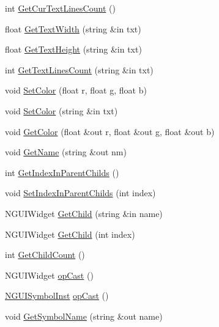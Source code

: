 \begin{DoxyCompactItemize}
\item 
int \hyperlink{class_n_g_u_i_symbol_inst_a42306f44487648c6b89a6aaea58bfd78}{Get\+Cur\+Text\+Lines\+Count} ()
\item 
float \hyperlink{class_n_g_u_i_symbol_inst_a7c510f7e08918ff1fb59a6c3c3c6032e}{Get\+Text\+Width} (string \&in txt)
\item 
float \hyperlink{class_n_g_u_i_symbol_inst_acc7696e689a4d12732d8b0551479bae7}{Get\+Text\+Height} (string \&in txt)
\item 
int \hyperlink{class_n_g_u_i_symbol_inst_a9fe942be44d88bbd95cc6fc43878b012}{Get\+Text\+Lines\+Count} (string \&in txt)
\item 
void \hyperlink{class_n_g_u_i_symbol_inst_a11756bc336a98048baf30cd8df92963e}{Set\+Color} (float r, float g, float b)
\item 
void \hyperlink{class_n_g_u_i_symbol_inst_afe876af80b93181735de886ab40393b5}{Set\+Color} (string \&in txt)
\item 
void \hyperlink{class_n_g_u_i_symbol_inst_a02d522637f50d01175f39599d9551d46}{Get\+Color} (float \&out r, float \&out g, float \&out b)
\item 
void \hyperlink{class_n_g_u_i_symbol_inst_a2b8f5429f7852573e2d061e278b13dbe}{Get\+Name} (string \&out nm)
\item 
int \hyperlink{class_n_g_u_i_symbol_inst_ae6273964b69513989236647dcfda9b17}{Get\+Index\+In\+Parent\+Childs} ()
\item 
void \hyperlink{class_n_g_u_i_symbol_inst_a62c27f61115c2704ec3af6041f8aca05}{Set\+Index\+In\+Parent\+Childs} (int index)
\item 
N\+G\+U\+I\+Widget \hyperlink{class_n_g_u_i_symbol_inst_a0e3dad8124c81f5049ea8d367a7dc0c3}{Get\+Child} (string \&in name)
\item 
N\+G\+U\+I\+Widget \hyperlink{class_n_g_u_i_symbol_inst_af944fb359f1cf67c6e1d1d405a46e211}{Get\+Child} (int index)
\item 
int \hyperlink{class_n_g_u_i_symbol_inst_a26b80186c9b979b766a7f54119f070e7}{Get\+Child\+Count} ()
\item 
N\+G\+U\+I\+Widget \hyperlink{class_n_g_u_i_symbol_inst_ad41bdaae76f47320fdfe84fac921bf47}{op\+Cast} ()
\item 
\hyperlink{class_n_g_u_i_symbol_inst}{N\+G\+U\+I\+Symbol\+Inst} \hyperlink{class_n_g_u_i_symbol_inst_a2338c9411dca8509d132e711082850b8}{op\+Cast} ()
\item 
void \hyperlink{class_n_g_u_i_symbol_inst_af80df6fadf5ad55885b65b749f66aa70}{Get\+Symbol\+Name} (string \&out name)
\end{DoxyCompactItemize}
